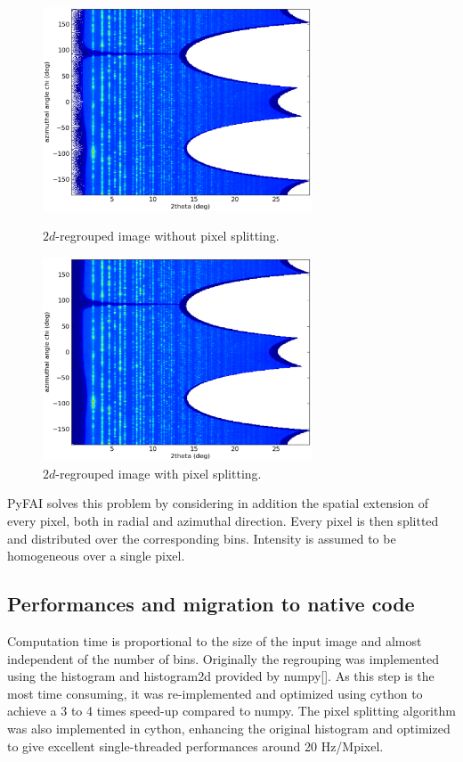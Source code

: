 \documentclass[a4paper]{jpconf}
\begin{document}
\begin{center}
\begin{figure}[h]
\begin{minipage}{8cm}
\includegraphics[width=8cm]{img/2Dhistogram.eps}
\caption{\label{rough}$2d$-regrouped image without pixel splitting.}
\end{minipage}\hspace{5mm}
\begin{minipage}{8cm}
\includegraphics[width=8cm]{img/2DwithSplit.eps}
\caption{\label{smooth}$2d$-regrouped image with pixel splitting.}
\end{minipage} 
\end{figure}
\end{center}

PyFAI solves this problem by considering in addition the spatial extension of
every pixel, both in radial    and azimuthal direction. Every pixel is then splitted and distributed over the corresponding bins. Intensity is assumed to be homogeneous over a single pixel.
\subsection{Performances and migration to native code}
Computation time is proportional to the size of the input image and almost
independent  of the number of bins. Originally the regrouping was implemented 
using the histogram and histogram2d provided by numpy[]. As this step is the
most  time consuming, it was re-implemented and optimized using cython to
achieve  a  3 to 4 times speed-up compared to numpy.
The pixel splitting algorithm was also implemented in cython, enhancing the 
original histogram and optimized to give excellent single-threaded performances 
around 20 Hz/Mpixel.
\end{document}

